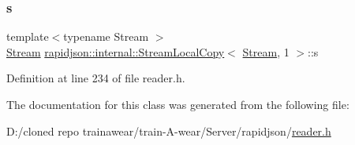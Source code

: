 \mbox{\label{classrapidjson_1_1internal_1_1_stream_local_copy_3_01_stream_00_011_01_4_a5070d23468ed1bd04aa29f62fe473cd5}} 
\subsubsection{\texorpdfstring{s}{s}}
{\footnotesize\ttfamily template$<$typename Stream $>$ \\
\mbox{\hyperlink{classrapidjson_1_1_stream}{Stream}} \mbox{\hyperlink{classrapidjson_1_1internal_1_1_stream_local_copy}{rapidjson\+::internal\+::\+Stream\+Local\+Copy}}$<$ \mbox{\hyperlink{classrapidjson_1_1_stream}{Stream}}, 1 $>$\+::s}



Definition at line 234 of file reader.\+h.



The documentation for this class was generated from the following file\+:\begin{DoxyCompactItemize}
\item 
D\+:/cloned repo trainawear/train-\/\+A-\/wear/\+Server/rapidjson/\mbox{\hyperlink{reader_8h}{reader.\+h}}\end{DoxyCompactItemize}
